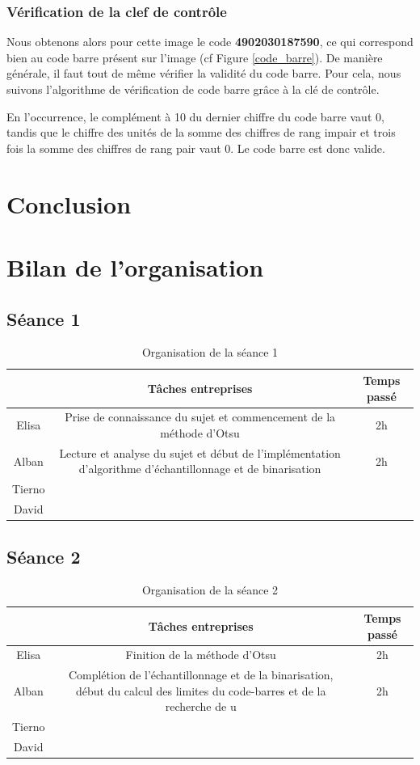 \documentclass{rapport}
\begin{document}
\subsubsection*{Vérification de la clef de contrôle}
Nous obtenons alors pour cette image le code \textbf{4902030187590}, ce qui correspond bien au code barre présent sur l'image (cf Figure \ref{code_barre}).
De manière générale, il faut tout de même vérifier la validité du code barre. Pour cela, nous suivons l'algorithme de vérification de code barre grâce à la clé de contrôle.

En l'occurrence, le complément à 10 du dernier chiffre du code barre vaut 0, tandis que le chiffre des unités de la somme des chiffres de rang impair et trois fois la somme des chiffres de rang pair vaut 0. 
Le code barre est donc valide.


\newpage 

\section{Conclusion}

\section{Bilan de l'organisation}

\subsection{Séance 1}

\begin{table}[H]
	\centering 
	\begin{tabular}{c|c|c}
		& Tâches entreprises& Temps passé\\ \hline
		Elisa& Prise de connaissance du sujet et commencement de la méthode d'Otsu& 2h\\ \hline
		Alban& Lecture et analyse du sujet et début de l'implémentation d'algorithme d'échantillonnage et de binarisation& 2h\\ \hline
		Tierno& & \\ \hline
		David& & 
	\end{tabular}
	\caption{Organisation de la séance 1}
\end{table}

\subsection{Séance 2}

\begin{table}[H]
	\centering 
	\begin{tabular}{c|c|c}
		& Tâches entreprises& Temps passé\\ \hline
		Elisa& Finition de la méthode d'Otsu & 2h\\ \hline
		Alban& Complétion de l'échantillonnage et de la binarisation, début du calcul des limites du code-barres et de la recherche de u& 2h\\ \hline
		Tierno& & \\ \hline
		David& & 
	\end{tabular}
	\caption{Organisation de la séance 2}
\end{table}
\end{document}

